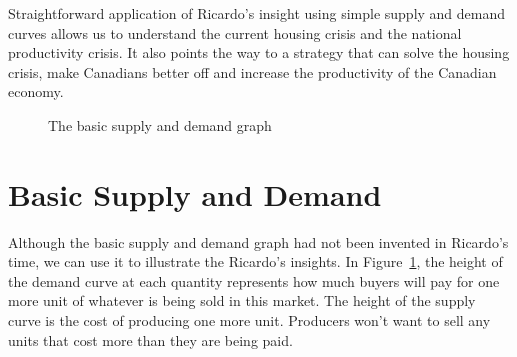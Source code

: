 Straightforward application of Ricardo's insight using simple supply and demand curves allows us to understand the current housing crisis and the national productivity crisis. It also points the way to a strategy that can solve the housing crisis, make Canadians better off and increase the productivity of the Canadian economy.

\begin{figure}[htbp]
\begin{center}
\caption{The basic supply and demand graph}
\label{Fig:SDFigure}
\end{center}
\end{figure}

\section{Basic Supply and Demand}
Although the basic supply and demand graph had not been invented in Ricardo's time, we can use it to illustrate the Ricardo's insights. In Figure~\ref{Fig:SDFigure}, the height of the demand curve at each quantity represents how much buyers will pay for  one more unit of whatever is being sold in this market. The height of the supply curve is the cost of producing one more unit. Producers won't want to sell any units that cost more than they are being paid.

